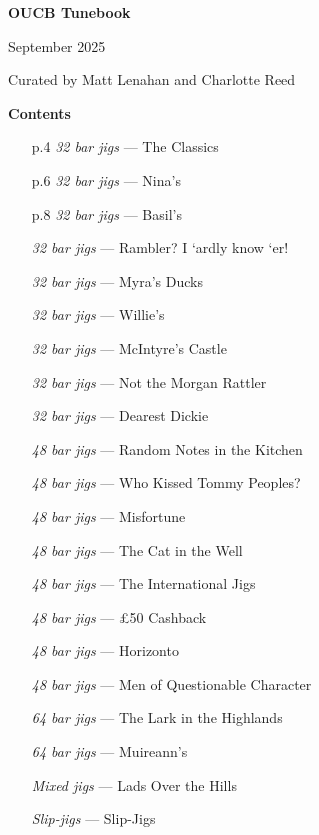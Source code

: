 \documentclass[11pt]{article}
\begin{document}

\vspace*{5\baselineskip}
\centerline{\Huge\textbf{OUCB Tunebook}}
\vspace{\baselineskip}
\centerline{\Large September 2025}
\vspace{2\baselineskip}
\centerline{Curated by Matt Lenahan and Charlotte Reed}
\clearpage

\centerline{\Large\textbf{Contents}}
\begin{multicols*}{2}
    \small
    \begin{enumerate}
        \item[p.4] \textit{32 bar jigs} --- The Classics
        \item[p.6] \textit{32 bar jigs} --- Nina's
        \item[p.8] \textit{32 bar jigs} --- Basil's
        \item[] \textit{32 bar jigs} --- Rambler? I `ardly know `er!
        \item[] \textit{32 bar jigs} --- Myra's Ducks
        \item[] \textit{32 bar jigs} --- Willie's
        \item[] \textit{32 bar jigs} --- McIntyre's Castle
        \item[] \textit{32 bar jigs} --- Not the Morgan Rattler
        \item[] \textit{32 bar jigs} --- Dearest Dickie
        \item[] \textit{48 bar jigs} --- Random Notes in the Kitchen
        \item[] \textit{48 bar jigs} --- Who Kissed Tommy Peoples?
        \item[] \textit{48 bar jigs} --- Misfortune
        \item[] \textit{48 bar jigs} --- The Cat in the Well
        \item[] \textit{48 bar jigs} --- The International Jigs
        \item[] \textit{48 bar jigs} --- £50 Cashback
        \item[] \textit{48 bar jigs} --- Horizonto
        \item[] \textit{48 bar jigs} --- Men of Questionable Character
        \item[] \textit{64 bar jigs} --- The Lark in the Highlands
        \item[] \textit{64 bar jigs} --- Muireann's
        \item[] \textit{Mixed jigs} --- Lads Over the Hills
        \item[] \textit{Slip-jigs} --- Slip-Jigs

\end{enumerate}
\end{multicols*}
\end{document}
